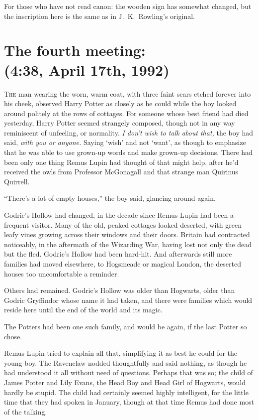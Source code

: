
\begin{chapterOpeningAuthorNote}
For those who have not read canon: the wooden sign has somewhat changed, but the inscription here is the same as in J.~K.~Rowling’s original.
\end{chapterOpeningAuthorNote}

\section{The fourth meeting:\\
(4:38\pm, April 17th, 1992)}

\lettrine{T}{he} man wearing the worn, warm coat, with three faint scars etched forever into his cheek, observed Harry Potter as closely as he could while the boy looked around politely at the rows of cottages. For someone whose best friend had died yesterday, Harry Potter seemed strangely composed, though not in any way reminiscent of unfeeling, or normality. \emph{I don’t wish to talk about that,} the boy had said, \emph{with you or anyone.} Saying ‘wish’ and not ‘want’, as though to emphasize that he was able to use grown-up words and make grown-up decisions. There had been only one thing Remus Lupin had thought of that might help, after he’d received the owls from Professor McGonagall and that strange man Quirinus Quirrell.

“There’s a lot of empty houses,” the boy said, glancing around again.

Godric’s Hollow had changed, in the decade since Remus Lupin had been a frequent visitor. Many of the old, peaked cottages looked deserted, with green leafy vines growing across their windows and their doors. Britain had contracted noticeably, in the aftermath of the Wizarding War, having lost not only the dead but the fled. Godric’s Hollow had been hard-hit. And afterwards still more families had moved elsewhere, to Hogsmeade or magical London, the deserted houses too uncomfortable a reminder.

Others had remained. Godric’s Hollow was older than Hogwarts, older than Godric Gryffindor whose name it had taken, and there were families which would reside here until the end of the world and its magic.

The Potters had been one such family, and would be again, if the last Potter so chose.

Remus Lupin tried to explain all that, simplifying it as best he could for the young boy. The Ravenclaw nodded thoughtfully and said nothing, as though he had understood it all without need of questions. Perhaps that was so; the child of James Potter and Lily Evans, the Head Boy and Head Girl of Hogwarts, would hardly be stupid. The child had certainly seemed highly intelligent, for the little time that they had spoken in January, though at that time Remus had done most of the talking.

